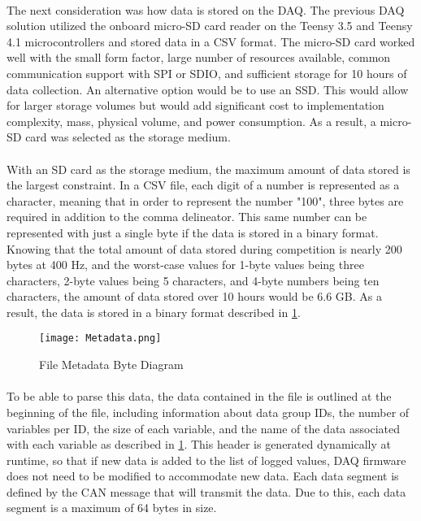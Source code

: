 \paragraph{}
The next consideration was how data is stored on the DAQ.
The previous DAQ solution utilized the onboard micro-SD card reader on the Teensy 3.5 \cite{TEENSY35} and Teensy 4.1 \cite{TEENSY41} microcontrollers and stored data in a CSV format.
The micro-SD card worked well with the small form factor, large number of resources available, common communication support with SPI or SDIO, and sufficient storage for 10 hours of data collection.
An alternative option would be to use an SSD.
This would allow for larger storage volumes but would add significant cost to implementation complexity, mass, physical volume, and power consumption.
As a result, a micro-SD card was selected as the storage medium.

\paragraph{}
With an SD card as the storage medium, the maximum amount of data stored is the largest constraint.
In a CSV file, each digit of a number is represented as a character, meaning that in order to represent the number "100", three bytes are required in addition to the comma delineator.
This same number can be represented with just a single byte if the data is stored in a binary format.
Knowing that the total amount of data stored during competition is nearly 200 bytes at 400 Hz, and the worst-case values for 1-byte values being three characters, 2-byte values being 5 characters, and 4-byte numbers being ten characters, the amount of data stored over 10 hours would be 6.6 GB.
As a result, the data is stored in a binary format described in \cref{fig:MetadataDiagram}.

\begin{figure}[H]
	\centering
	\texttt{[image: Metadata.png]}
	\caption{File Metadata Byte Diagram}
	\label{fig:MetadataDiagram}
\end{figure}

\paragraph{}
To be able to parse this data, the data contained in the file is outlined at the beginning of the file, including information about data group IDs, the number of variables per ID, the size of each variable, and the name of the data associated with each variable as described in \cref{fig:MetadataDiagram}.
This header is generated dynamically at runtime, so that if new data is added to the list of logged values, DAQ firmware does not need to be modified to accommodate new data.
Each data segment is defined by the CAN message that will transmit the data.
Due to this, each data segment is a maximum of 64 bytes in size.

